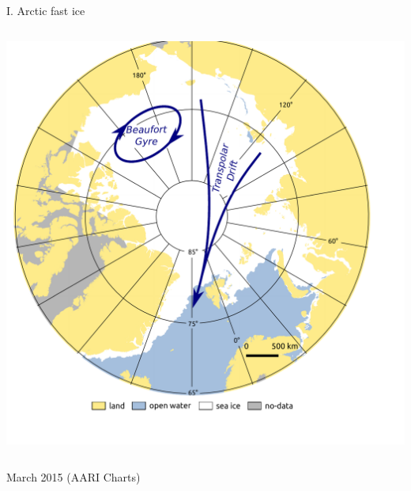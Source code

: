 \documentclass[8pt]{beamer}
\newcommand\Fontvi{\fontsize{6}{7.2}\selectfont}
\begin{document}
\setwatermark{\fontsize{125pt}{125pt}\selectfont{}}
\begin{frame}[fragile]{I. Arctic fast ice}
	\begin{columns}
		\includegraphics[width=1\textwidth]{./img/ArcticSI_Mar2015_SI_circ.pdf}\\
	\end{columns}
\Fontvi
17 March 2015 (AARI Charts)
\end{frame}
\end{document}
